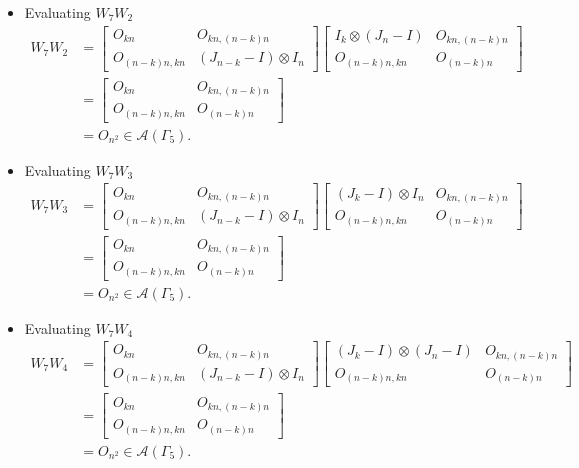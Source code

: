 \begin{itemize}
\item Evaluating $W_{7}W_{2}$
\begin{align*}
    W_7W_2
    &= \begin{bmatrix}
        O_{kn} & O_{kn, (n-k)n} \\
        O_{(n-k)n,kn} & (J_{n - k} - I) \otimes I_n
    \end{bmatrix}
    \begin{bmatrix}
        I_{k}\otimes(J_n-I) & O_{kn, (n-k)n} \\
        O_{(n-k)n,kn} & O_{(n - k)n}
    \end{bmatrix}\\
    &= \begin{bmatrix}
        O_{kn} & O_{kn, (n-k)n} \\
        O_{(n-k)n,kn} & O_{(n - k)n}
    \end{bmatrix}\\
    &= O_{n^2} \in\mathcal{A}(\Gamma_5).
\end{align*}

\item Evaluating $W_{7}W_{3}$
\begin{align*}
    W_7W_3
    &= \begin{bmatrix}
        O_{kn} & O_{kn, (n-k)n} \\
        O_{(n-k)n,kn} & (J_{n - k} - I) \otimes I_n
    \end{bmatrix}
    \begin{bmatrix}
        (J_k-I)\otimes I_n & O_{kn, (n-k)n} \\
        O_{(n-k)n,kn} & O_{(n - k)n}
    \end{bmatrix}\\
    &= \begin{bmatrix}
        O_{kn} & O_{kn, (n-k)n} \\
        O_{(n-k)n,kn} & O_{(n - k)n}
    \end{bmatrix}\\
    &= O_{n^2} \in\mathcal{A}(\Gamma_5).
\end{align*}

\item Evaluating $W_{7}W_{4}$
\begin{align*}
    W_7W_4
    &= \begin{bmatrix}
        O_{kn} & O_{kn, (n-k)n} \\
        O_{(n-k)n,kn} & (J_{n - k} - I) \otimes I_n
    \end{bmatrix}
    \begin{bmatrix}
        (J_k-I)\otimes (J_n-I) & O_{kn, (n-k)n} \\
        O_{(n-k)n,kn} & O_{(n - k)n}
    \end{bmatrix}\\
    &= \begin{bmatrix}
        O_{kn} & O_{kn, (n-k)n} \\
        O_{(n-k)n,kn} & O_{(n - k)n}
    \end{bmatrix}\\
    &= O_{n^2} \in\mathcal{A}(\Gamma_5).
\end{align*}


\end{itemize}
